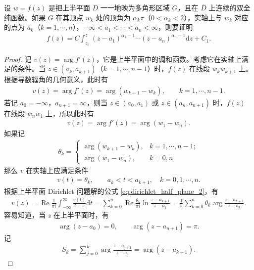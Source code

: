 \documentclass[../../main.tex]{subfiles}%
\begin{document}
\begin{example}
设 \(w=f(z)\) 是把上半平面 \(D\) 一一地映为多角形区域 \(G\)，且在 \(\overline{D}\) 上连续的双全纯函数。如果 \(G\) 在其顶点 \(w_k\) 处的顶角为 \(\alpha_k\pi\)（\(0<\alpha_k<2\)），实轴上与 \(w_k\) 对应的点为 \(a_k\)（\(k=1,\cdots,n\)），\(-\infty<a_1<\cdots<a_n<\infty\)，则要证明
\begin{align}
f(z)=C\int_{z_0}^{z}(z-a_1)^{\alpha_1-1}\cdots(z-a_n)^{\alpha_n-1}\mathrm{d}z+C_1. \label{eq:schwarz_christoffel}
\end{align}
\end{example}

\begin{proof}
记 \(v(z)=\arg f'(z)\)，它是上半平面中的调和函数。考虑它在实轴上满足的条件。当 \(z\in(a_k,a_{k+1})\)（\(k=1,\cdots,n-1\)）时，\(f(z)\) 在线段 \(w_kw_{k+1}\) 上。根据导数辐角的几何意义，此时有
\begin{align*}
v(z)=\arg f'(z)=\arg(w_{k+1}-w_k), \qquad k=1,\cdots,n-1.
\end{align*}
若记 \(a_0=-\infty\)，\(a_{n+1}=\infty\)，则当 \(z\in(a_0,a_1)\) 或 \(z\in(a_n,a_{n+1})\) 时，\(f(z)\) 在线段 \(w_nw_1\) 上，所以此时有
\begin{align*}
v(z)=\arg f'(z)=\arg(w_1-w_n).
\end{align*}
如果记
\begin{align}
\theta_k=
\begin{cases}
\arg(w_{k+1}-w_k), & k=1,\cdots,n-1; \\
\arg(w_1-w_n), & k=0,n.
\end{cases} \label{eq:theta_k_def}
\end{align}
那么 \(v\) 在实轴上应满足条件
\begin{align*}
v(t)=\theta_k, \qquad a_k<t<a_{k+1}, \quad k=0,1,\cdots,n.
\end{align*}
根据上半平面 Dirichlet 问题解的公式 \eqref{eq:dirichlet_half_plane_2}，有
\begin{align*}
v(z)=\operatorname{Re} \frac{1}{\pi i}\int_{-\infty}^{\infty}\frac{v(t)}{t-z}\mathrm{d}t =\sum_{k=0}^{n} \operatorname{Re} \frac{\theta_k}{\pi i}\ln\frac{z-a_{k+1}}{z-a_k} =\frac{1}{\pi}\sum_{k=0}^{n} \theta_k \arg\frac{z-a_{k+1}}{z-a_k}.
\end{align*}
容易知道，当 \(z\) 在上半平面时，有
\begin{align}
\arg(z-a_0)=0, \qquad \arg(z-a_{n+1})=\pi. \label{eq:arg_boundary}
\end{align}
记
\begin{align*}
S_k=\sum_{j=0}^{k} \arg\frac{z-a_{j+1}}{z-a_j}=\arg(z-a_{k+1}).

\end{align*}
\end{proof}
\end{document}
